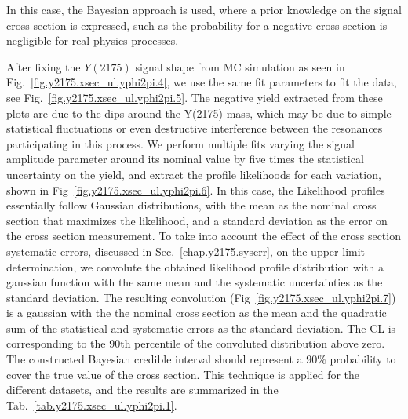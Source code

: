 \noindent In this case, the Bayesian approach is used, where a prior knowledge on the signal cross section is expressed, such as the probability for a negative cross section is negligible for real physics processes.
~\par After fixing the $Y(2175)$ signal shape from MC simulation as seen in Fig.~\ref{fig.y2175.xsec_ul.yphi2pi.4}, we use the same fit parameters to fit the data, see Fig.~\ref{fig.y2175.xsec_ul.yphi2pi.5}. The negative yield extracted from these plots are due to the dips around the Y(2175) mass, which may be due to simple statistical fluctuations or even destructive interference between the resonances participating in this process. We perform multiple fits varying the signal amplitude parameter around its nominal value by five times the statistical uncertainty on the yield, and extract the profile likelihoods for each variation, shown in Fig~\ref{fig.y2175.xsec_ul.yphi2pi.6}. In this case, the Likelihood profiles essentially follow Gaussian distributions, with the mean as the nominal cross section that maximizes the likelihood, and a standard deviation as the error on the cross section measurement. To take into account the effect of the cross section systematic errors, discussed in Sec.~\ref{chap.y2175.syserr}, on the upper limit determination, we convolute the obtained likelihood profile distribution with a gaussian function with the same mean and the systematic uncertainties as the standard deviation. The resulting convolution (Fig~\ref{fig.y2175.xsec_ul.yphi2pi.7}) is a gaussian with the the nominal cross section as the mean and the quadratic sum of the statistical and systematic errors as the standard deviation. The CL is corresponding to the 90th percentile of the convoluted distribution above zero. The constructed Bayesian credible interval should represent a $90\%$ probability to cover the true value of the cross section. This technique is applied for the different datasets, and the results are summarized in the Tab.~\ref{tab.y2175.xsec_ul.yphi2pi.1}.

